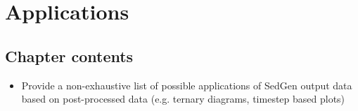 \chapter{Applications}\label{ch:applications}

\section{Chapter contents}
\begin{itemize}
    \item Provide a non-exhaustive list of possible applications of SedGen output data based on post-processed data (e.g. ternary diagrams, timestep based plots)
\end{itemize}




\cleardoublepage

